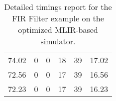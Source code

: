 \begin{table}[h]
{\begin{tabular}{cccccc}
            74.02              & 0                          & 0                          & 18                         & 39                         & 17.02                  \\
            72.56              & 0                          & 0                          & 17                         & 39                         & 16.56                  \\
            72.23              & 0                          & 0                          & 17                         & 39                         & 16.23                  \\
            \bottomrule
        \end{tabular}
    }
    \caption{Detailed timings report for the FIR Filter example on the optimized MLIR-based simulator.}
\end{table}

